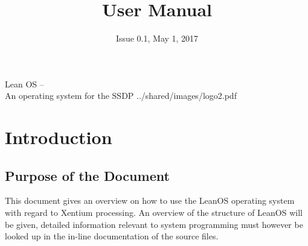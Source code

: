 \title{User Manual}
\def \documentid {LEANOS-UVIE-UM-001}
\date{Issue 0.1, May 1, 2017}

\newcommand\affil[1]{\textsuperscript#1}

\def\preparedby {Armin Luntzer\affil{1}}
\def\checkedby {Roland Ottensamer\affil{1}}
\def\approvedby {Franz Kerschbaum\affil{1}}

\def\affiliations{
	\affil{1} Department of Astrophysics, University of Vienna
}









\usepackage{vhistory}

\usepackage{biblatex}


\usepackage{listings}


\usepackage{appendix}


\lstset{style=customc} 


\setmainfont{MyriadPro-SemiCondensed}
\uvietitlepage%
{Lean OS --\\ An operating system for the SSDP}%
{\doctitle}%
{../shared/images/logo2.pdf}
\setmainfont{MyriadPro}

\approvalpage

\tableofcontents
\newpage



\begin{versionhistory}
\end{versionhistory}


\chapter{Introduction}

\section{Purpose of the Document}

This document gives an overview on how to use the LeanOS operating system with
regard to Xentium processing. An overview of the structure of LeanOS will be
given, detailed information relevant to system programming must however be 
looked up in the in-line documentation of the source files.

